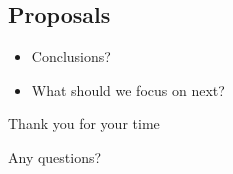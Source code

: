 \subsection{Proposals} 
\begin{frame}{\subsecname}
\begin{itemize}
\item Conclusions?
\item What should we focus on next?
\end{itemize}
\end{frame}



\begin{nosidebarframe}

\centering

\color{blue}
\huge Thank you for your time 

\vskip 2cm

\huge Any questions?

\end{nosidebarframe}